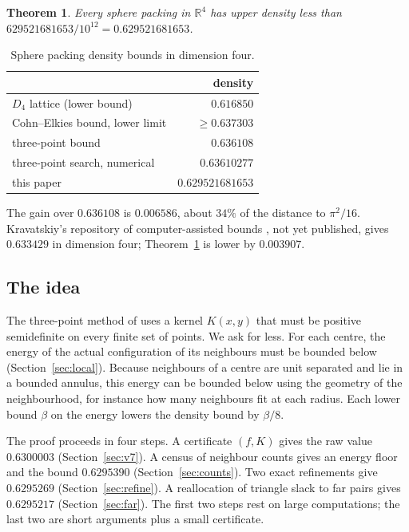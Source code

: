 \documentclass[11pt]{amsart}
\numberwithin{equation}{section}
\newtheorem{theorem}{Theorem}[section]
\theoremstyle{remark}
\newcommand{\R}{\mathbb{R}}
\begin{document}
\begin{theorem}\label{thm:main}
Every sphere packing in $\R^4$ has upper density less than $629521681653/10^{12}=0.629521681653$.
\end{theorem}

\begin{table}[ht]
\caption{Sphere packing density bounds in dimension four.}\label{tab:bounds}
\centering
\begin{tabular}{lr}
\toprule
& density \\
\midrule
$D_4$ lattice (lower bound) & $0.616850$ \\
Cohn--Elkies bound, lower limit \cite{Li} & $\ge0.637303$ \\
three-point bound \cite{CdLS} & $0.636108$ \\
three-point search, numerical \cite{Tutunov} & $0.63610277$ \\
this paper & $\mathbf{0.629521681653}$ \\
\bottomrule
\end{tabular}
\end{table}

The gain over $0.636108$ is $0.006586$, about $34\%$ of the distance to $\pi^2/16$. Kravatskiy's repository of computer-assisted bounds \cite{Kra}, not yet published, gives $0.633429$ in dimension four; Theorem~\ref{thm:main} is lower by $0.003907$.

\subsection*{The idea}

The three-point method of \cite{CdLS} uses a kernel $K(x,y)$ that must be positive semidefinite on every finite set of points. We ask for less. For each centre, the energy of the actual configuration of its neighbours must be bounded below (Section~\ref{sec:local}). Because neighbours of a centre are unit separated and lie in a bounded annulus, this energy can be bounded below using the geometry of the neighbourhood, for instance how many neighbours fit at each radius. Each lower bound $\beta$ on the energy lowers the density bound by $\beta/8$.

The proof proceeds in four steps. A certificate $(f,K)$ gives the raw value $0.6300003$ (Section~\ref{sec:v7}). A census of neighbour counts gives an energy floor and the bound $0.6295390$ (Section~\ref{sec:counts}). Two exact refinements give $0.6295269$ (Section~\ref{sec:refine}). A reallocation of triangle slack to far pairs gives $0.6295217$ (Section~\ref{sec:far}). The first two steps rest on large computations; the last two are short arguments plus a small certificate.
\end{document}
